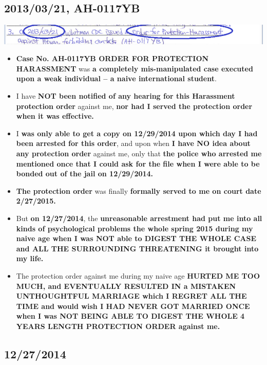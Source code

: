 \documentclass[9pt, b5paper]{article}
\begin{document}
\subsection{2013/03/21, AH-0117YB}
\label{sec-5-3}

\includegraphics[width=.9\linewidth]{./pic/dearCousin_20220920_152959.png}
\begin{itemize}
\item \textbf{Case No. AH-0117YB ORDER FOR PROTECTION HARASSMENT} was \textbf{a completely mis-manipulated case executed upon a weak individual -- a naive international student}.
\item I have \textbf{NOT been notified of any hearing for this Harassment protection order} against me, \textbf{nor had I served the protection order when it was effective.}
\item I \textbf{was only able to get a copy on 12/29/2014 upon which day I had been arrested for this order}, and upon when \textbf{I have NO idea about any protection order} against me, only that \textbf{the police who arrested me mentioned once that I could ask for the file when I were able to be bonded out of the jail on 12/29/2014.}
\item \textbf{The protection order} was finally \textbf{formally served to me on court date 2/27/2015.}
\item But \textbf{on 12/27/2014}, the \textbf{unreasonable arrestment had put me into all kinds of psychological problems the whole spring 2015 during my naive age when I was NOT able to DIGEST THE WHOLE CASE and ALL THE SURROUNDING THREATENING it brought into my life.}
\item The protection order against me during my naive age \textbf{HURTED ME TOO MUCH, and EVENTUALLY RESULTED IN a MISTAKEN UNTHOUGHTFUL MARRIAGE which I REGRET ALL THE TIME and would wish I HAD NEVER GOT MARRIED ONCE when I was NOT BEING ABLE TO DIGEST THE WHOLE 4 YEARS LENGTH PROTECTION ORDER against me.}
\end{itemize}
\subsection{12/27/2014}
\label{sec-5-4}
\end{document}
